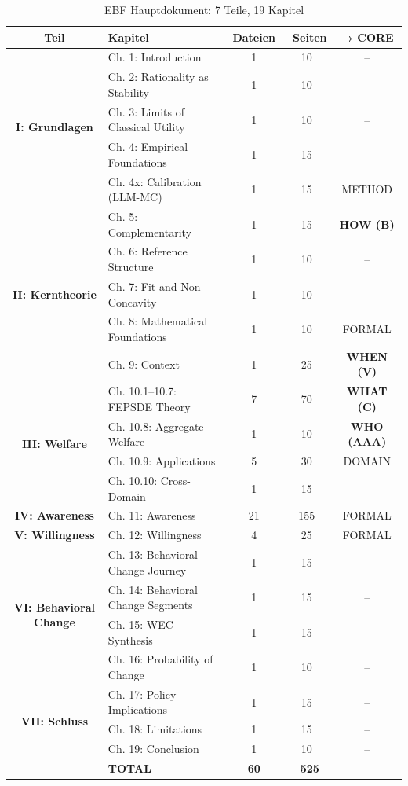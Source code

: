 \documentclass[12pt,a4paper]{article}
\begin{document}
\begin{table}[htbp]
\centering
\caption{EBF Hauptdokument: 7 Teile, 19 Kapitel}
\renewcommand{\arraystretch}{1.2}
\small
\begin{tabular}{@{}clccc@{}}
\toprule
\textbf{Teil} & \textbf{Kapitel} & \textbf{Dateien} & \textbf{~Seiten} & \textbf{→ CORE} \\
\midrule
\multirow{5}{*}{\textbf{I: Grundlagen}} 
& Ch. 1: Introduction & 1 & 10 & -- \\
& Ch. 2: Rationality as Stability & 1 & 10 & -- \\
& Ch. 3: Limits of Classical Utility & 1 & 10 & -- \\
& Ch. 4: Empirical Foundations & 1 & 15 & -- \\
& Ch. 4x: Calibration (LLM-MC) & 1 & 15 & METHOD \\
\midrule
\multirow{5}{*}{\textbf{II: Kerntheorie}} 
& Ch. 5: Complementarity & 1 & 15 & \textbf{HOW (B)} \\
& Ch. 6: Reference Structure & 1 & 10 & -- \\
& Ch. 7: Fit and Non-Concavity & 1 & 10 & -- \\
& Ch. 8: Mathematical Foundations & 1 & 10 & FORMAL \\
& Ch. 9: Context & 1 & 25 & \textbf{WHEN (V)} \\
\midrule
\multirow{4}{*}{\textbf{III: Welfare}} 
& Ch. 10.1--10.7: FEPSDE Theory & 7 & 70 & \textbf{WHAT (C)} \\
& Ch. 10.8: Aggregate Welfare & 1 & 10 & \textbf{WHO (AAA)} \\
& Ch. 10.9: Applications & 5 & 30 & DOMAIN \\
& Ch. 10.10: Cross-Domain & 1 & 15 & -- \\
\midrule
\textbf{IV: Awareness} & Ch. 11: Awareness & 21 & 155 & FORMAL \\
\midrule
\textbf{V: Willingness} & Ch. 12: Willingness & 4 & 25 & FORMAL \\
\midrule
\multirow{4}{*}{\textbf{VI: Behavioral Change}} 
& Ch. 13: Behavioral Change Journey & 1 & 15 & -- \\
& Ch. 14: Behavioral Change Segments & 1 & 15 & -- \\
& Ch. 15: WEC Synthesis & 1 & 15 & -- \\
& Ch. 16: Probability of Change & 1 & 10 & -- \\
\midrule
\multirow{3}{*}{\textbf{VII: Schluss}} 
& Ch. 17: Policy Implications & 1 & 15 & -- \\
& Ch. 18: Limitations & 1 & 15 & -- \\
& Ch. 19: Conclusion & 1 & 10 & -- \\
\midrule
& \textbf{TOTAL} & \textbf{60} & \textbf{~525} & \\
\bottomrule
\end{tabular}
\end{table}
\end{document}
